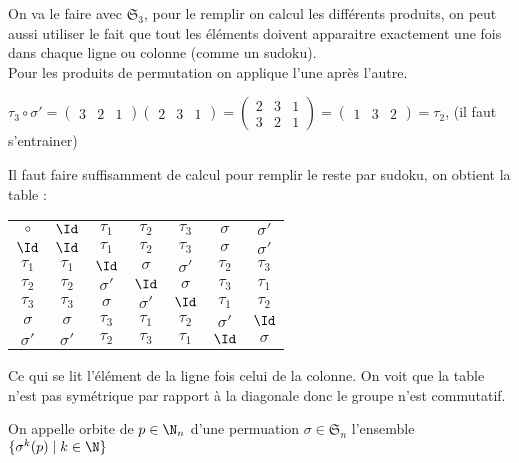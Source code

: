 \begin{ex}
On va le faire avec $\mathfrak{S}_3$, pour le remplir on calcul les différents produits, on peut aussi utiliser le fait que tout les éléments doivent apparaitre exactement une fois dans chaque ligne ou colonne (comme un sudoku).\\
Pour les produits de permutation on applique l'une après l'autre.

$\tau_3\circ\sigma'=\begin{pmatrix}
3 & 2 & 1
\end{pmatrix}\begin{pmatrix}
2 & 3 & 1 
\end{pmatrix}=\begin{pmatrix}
2 & 3 & 1\\
3 & 2 & 1 
\end{pmatrix}=\begin{pmatrix}
1 & 3 & 2 
\end{pmatrix}=\tau_2$, (il faut s'entrainer)

Il faut faire suffisamment de calcul pour remplir le reste par sudoku, on obtient la table : 
\begin{center}
\noindent\begin{tabular}{c | c c c c c c}
$\circ$ & $\Id$ & $\tau_1$ & $\tau_2$ & $\tau_3$ & $\sigma$ & $\sigma'$  \\
\cline{1-7}
$\Id$ & $\Id$ & $\tau_1$ & $\tau_2$ & $\tau_3$ & $\sigma$ & $\sigma'$ \\
$\tau_1$ &$\tau_1$ & $\Id$ & $\sigma$ & $\sigma'$ & $\tau_2$ & $\tau_3$ \\
$\tau_2$ & $\tau_2$ & $\sigma'$ & $\Id$ & $\sigma$ & $\tau_3$ & $\tau_1$ \\
$\tau_3$ & $\tau_3$ & $\sigma$ & $\sigma'$ & $\Id$ & $\tau_1$ & $\tau_2$ \\
$\sigma$ & $\sigma$ & $\tau_3$ & $\tau_1$ & $\tau_2$ & $\sigma'$ & $\Id$ \\
$\sigma'$ & $\sigma'$ & $\tau_2$ & $\tau_3$ & $\tau_1$ & $\Id$ & $\sigma$\\
\end{tabular}
\end{center}
Ce qui se lit l'élément de la ligne fois celui de la colonne. On voit que la table n'est pas symétrique par rapport à la diagonale donc le groupe n'est commutatif.
\end{ex}

\begin{defini}
    On appelle orbite de $p\in\N_{n}$ d'une permuation $\sigma\in\mathfrak{S}_n$ l'ensemble $\{\sigma^k(p)\mid k\in\N\}$
\end{defini}

